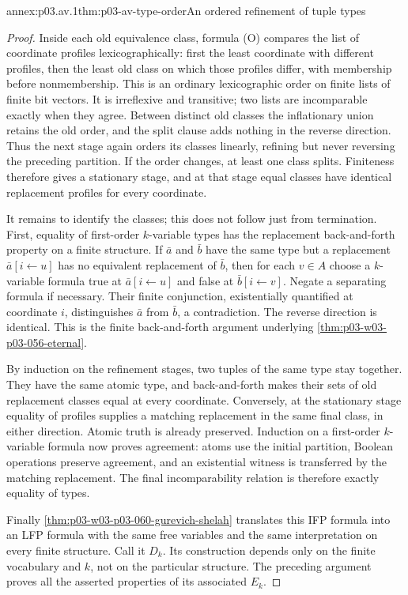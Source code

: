 \begin{annexitem}{annex:p03.av.1}{thm:p03-av-type-order}{An ordered refinement of tuple types}
\begin{proof}
Inside each old equivalence class, formula (O) compares the list of
coordinate profiles lexicographically: first the least coordinate
with different profiles, then the least old class on which those
profiles differ, with membership before nonmembership. This is an
ordinary lexicographic order on finite lists of finite bit vectors.
It is irreflexive and transitive; two lists are incomparable exactly
when they agree. Between distinct old classes the inflationary union
retains the old order, and the split clause adds nothing in the reverse
direction. Thus the next stage again orders its classes linearly,
refining but never reversing the preceding partition. If the order
changes, at least one class splits. Finiteness therefore gives a
stationary stage, and at that stage equal classes have identical
replacement profiles for every coordinate.

It remains to identify the classes; this does not follow just from
termination. First, equality of first-order \(k\)-variable types
has the replacement back-and-forth property on a finite structure.
If \(\bar a\) and \(\bar b\) have the same type but a
replacement \(\bar a[i\leftarrow u]\) has no equivalent
replacement of \(\bar b\), then for each \(v\in A\)
choose a \(k\)-variable formula true at
\(\bar a[i\leftarrow u]\) and false at
\(\bar b[i\leftarrow v]\). Negate a separating formula if
necessary. Their finite conjunction, existentially quantified at
coordinate \(i\), distinguishes \(\bar a\) from
\(\bar b\), a contradiction. The reverse direction is identical.
This is the finite back-and-forth argument underlying
\cref{thm:p03-w03-p03-056-eternal}.

By induction on the refinement stages, two tuples of the same type
stay together. They have the same atomic type, and back-and-forth
makes their sets of old replacement classes equal at every coordinate.
Conversely, at the stationary stage equality of profiles supplies a
matching replacement in the same final class, in either direction.
Atomic truth is already preserved. Induction on a first-order
\(k\)-variable formula now proves agreement: atoms use the initial
partition, Boolean operations preserve agreement, and an existential
witness is transferred by the matching replacement. The final
incomparability relation is therefore exactly equality of types.

Finally \cref{thm:p03-w03-p03-060-gurevich-shelah} translates this
IFP formula into an LFP formula with the same free variables and the
same interpretation on every finite structure. Call it \(D_k\).
Its construction depends only on the finite vocabulary and \(k\),
not on the particular structure. The preceding argument proves all
the asserted properties of its associated \(E_k\).
\end{proof}
\end{annexitem}

